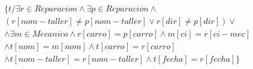 \documentclass{article}
\begin{document}
	\begin{align*}
	& \{ t / \exists r \in Reparacion \land \exists p \in Reparacion \land \\
	& ( r[nom-taller] \neq p[nom-taller] \lor r[dir] \neq p[dir] ) \lor \\
	& \land \exists m \in Mecanico \land r[carro] = p[carro] \land m[ci] = r[ci-mec] \\ 
	& \land t[nom] = m[nom] \land t[carro] = r[carro] \\
	& \land t[nom-taller] = r[nom-taller] \land t[fecha] = r[fecha] \} 
	\end{align*}
	
\end{document}
